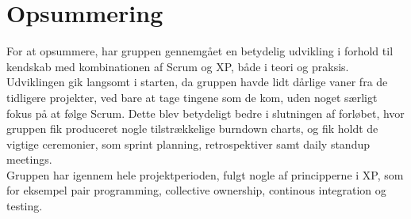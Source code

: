 \section{Opsummering}
For at opsummere, har gruppen gennemgået en betydelig udvikling i forhold til kendskab med kombinationen af
Scrum og XP, både i teori og praksis. Udviklingen gik langsomt i starten, da gruppen havde lidt dårlige vaner fra de
tidligere projekter, ved bare at tage tingene som de kom, uden noget særligt fokus på at følge Scrum. Dette blev betydeligt
bedre i slutningen af forløbet, hvor gruppen fik produceret nogle tilstrækkelige burndown charts, og fik holdt de vigtige ceremonier,
som sprint planning, retrospektiver samt daily standup meetings. \\

Gruppen har igennem hele projektperioden, fulgt nogle af principperne i XP, som for eksempel pair programming, collective ownership, continous integration
og testing.